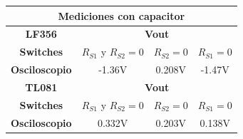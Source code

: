 \documentclass[a4paper]{article}
\begin{document}
\begin{table}[H]
\begin{center}
\begin{tabular}{|c|c|c|c|}
\hline
\multicolumn{4}{|c|}{\textbf{Mediciones con capacitor}}                                        \\ \hline
\textbf{LF356}        & \multicolumn{3}{c|}{\textbf{Vout}}                       \\ \hline
\textbf{Switches}     & $R_{S1}$ y $ R_{S2} = 0$ & $ R_{S2} = 0$ & $ R_{S1} = 0$ \\ \hline
\textbf{Osciloscopio} & -1.36V                    & 0.208V      & -1.47V      \\ \hline
\textbf{TL081}        & \multicolumn{3}{c|}{\textbf{Vout}}                       \\ \hline
\textbf{Switches}     & $R_{S1}$ y $ R_{S2} = 0$ & $ R_{S2} = 0$ & $ R_{S1} = 0$ \\ \hline
\textbf{Osciloscopio} & 0.332V                   & 0.203V        & 0.138V        \\ \hline
\end{tabular}
\end{center}
\end{table}
\end{document}
